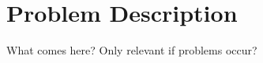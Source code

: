 \chapter{Problem Description}
\label{sec:problem_description}

What comes here? Only relevant if problems occur?